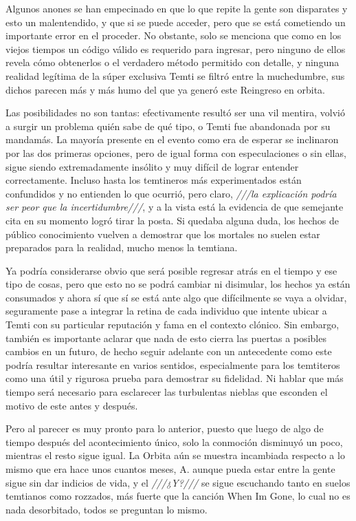 \documentclass[
  spanish,
]{book}
\begin{document}
Algunos anones se han empecinado en que lo que repite la gente son disparates y esto un malentendido, y que si se puede acceder, pero que se está cometiendo un importante error en el proceder. No obstante, solo se menciona que como en los viejos tiempos un código válido es requerido para ingresar, pero ninguno de ellos revela cómo obtenerlos o el verdadero método permitido con detalle, y ninguna realidad legítima de la súper exclusiva Temti se filtró entre la muchedumbre, sus dichos parecen más y más humo del que ya generó este Reingreso en orbita.

Las posibilidades no son tantas: efectivamente resultó ser una vil mentira, volvió a surgir un problema quién sabe de qué tipo, o Temti fue abandonada por su mandamás. La mayoría presente en el evento como era de esperar se inclinaron por las dos primeras opciones, pero de igual forma con especulaciones o sin ellas, sigue siendo extremadamente insólito y muy difícil de lograr entender correctamente. Incluso hasta los temtineros más experimentados están confundidos y no entienden lo que ocurrió, pero claro, \emph{///la explicación podría ser peor que la incertidumbre///}, y a la vista está la evidencia de que semejante cita en su momento logró tirar la posta. Si quedaba alguna duda, los hechos de público conocimiento vuelven a demostrar que los mortales no suelen estar preparados para la realidad, mucho menos la temtiana.

Ya podría considerarse obvio que será posible regresar atrás en el tiempo y ese tipo de cosas, pero que esto no se podrá cambiar ni disimular, los hechos ya están consumados y ahora sí que sí se está ante algo que difícilmente se vaya a olvidar, seguramente pase a integrar la retina de cada individuo que intente ubicar a Temti con su particular reputación y fama en el contexto clónico. Sin embargo, también es importante aclarar que nada de esto cierra las puertas a posibles cambios en un futuro, de hecho seguir adelante con un antecedente como este podría resultar interesante en varios sentidos, especialmente para los temtiteros como una útil y rigurosa prueba para demostrar su fidelidad. Ni hablar que más tiempo será necesario para esclarecer las turbulentas nieblas que esconden el motivo de este antes y después.

Pero al parecer es muy pronto para lo anterior, puesto que luego de algo de tiempo después del acontecimiento único, solo la conmoción disminuyó un poco, mientras el resto sigue igual. La Orbita aún se muestra incambiada respecto a lo mismo que era hace unos cuantos meses, A. aunque pueda estar entre la gente sigue sin dar indicios de vida, y el \emph{///¿Y?///} se sigue escuchando tanto en suelos temtianos como rozzados, más fuerte que la canción When Im Gone, lo cual no es nada desorbitado, todos se preguntan lo mismo.
\end{document}
